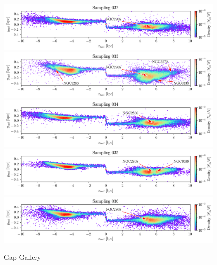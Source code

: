\documentclass{aa}
\begin{document}
\begin{appendix}
    \begin{figure}
      \centering
      \includegraphics[width=\linewidth]{gallery_of_gaps_monte-carlo-032.png}
      \includegraphics[width=\linewidth]{gallery_of_gaps_monte-carlo-033.png}
      \includegraphics[width=\linewidth]{gallery_of_gaps_monte-carlo-034.png}      
      \includegraphics[width=\linewidth]{gallery_of_gaps_monte-carlo-035.png}
      \includegraphics[width=\linewidth]{gallery_of_gaps_monte-carlo-036.png}      
      \caption{Gap Gallery}
      \label{fig:gallery8}
      \end{figure}    




\end{appendix}
\end{document}
